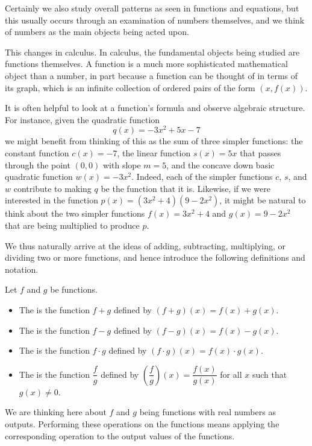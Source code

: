 \documentclass{ximera}
\begin{document}
	Certainly we also study overall patterns as seen in functions and equations, but this usually occurs through an examination of numbers themselves, 
	and we think of numbers as the main objects being acted upon.
	
	This changes in calculus.  In calculus, the fundamental objects being studied are functions themselves.  A function is a much more sophisticated 
	mathematical object than a number, in part because a function can be thought of in terms of its graph, which is an infinite collection of ordered 
	pairs of the form $(x,f(x))$.
	
	It is often helpful to look at a function's formula and observe algebraic structure.  For instance, given the quadratic function
	\[ q(x) = -3x^2 + 5x - 7 \]
	we might benefit from thinking of this as the sum of three simpler functions:  the constant function $c(x) = -7$, the linear function $s(x) = 5x$ that 
	passes through the point $(0,0)$ with slope $m = 5$, and the concave down basic quadratic function $w(x) = -3x^2$.  
	Indeed, each of the simpler functions $c$, $s$, and $w$ contribute to making $q$ be the function that it is.  Likewise, if we were interested in 
	the function $p(x) = (3x^2 + 4)(9 - 2x^2)$, it might be natural to think about the two simpler functions $f(x) = 3x^2 + 4$ and $g(x) = 9 - 2x^2$ 
	that are being multiplied to produce $p$.
	
	We thus naturally arrive at the ideas of adding, subtracting, multiplying, or dividing two or more functions, and hence introduce the following definitions and notation.
	\begin{definition}
		Let $f$ and $g$ be functions. 
		\begin{itemize}[label=\textbullet]
			\item The  is the function $f + g$ defined by $(f+g)(x) = f(x) + g(x)$.\\
			\item The  is the function $f - g$ defined by $(f-g)(x) = f(x) - g(x)$.\\
			\item The  is the function $f \cdot g$ defined by $(f \cdot g)(x) = f(x) \cdot g(x)$.\\
			\item The  is the function $\dfrac{f}{g}$ defined by $\left( \dfrac{f}{g} \right)(x) = \dfrac{f(x)}{g(x)}$ for all $x$ such that $g(x) \neq 0$.
		\end{itemize}
	\end{definition}
	We are thinking here about $f$ and $g$ being functions with real numbers as outputs. Performing these operations on the functions means applying 
	the corresponding operation to the output values of the functions.
	
\end{document}
